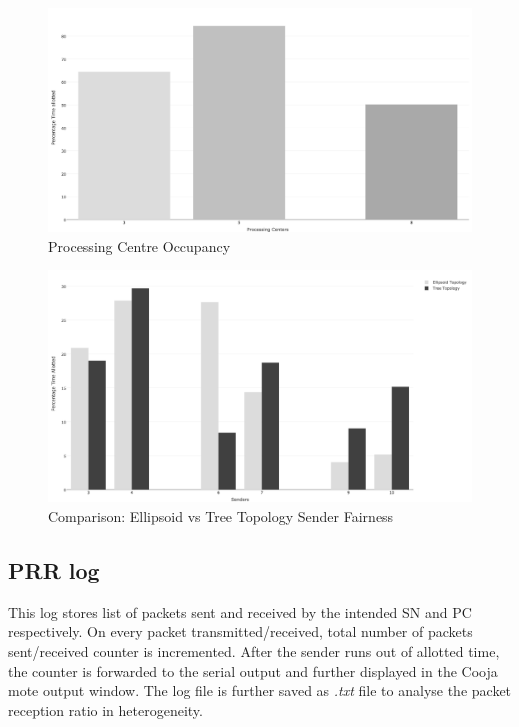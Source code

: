 \begin{enumerate}
    	\begin{figure}
        \centering
        \includegraphics[width=1.0\textwidth]{gfx/RPlots/PCOccupancy.png}
        \caption{Processing Centre Occupancy}
        \label{fig:pcenterOccupancy}
        \end{figure}
        
    \end{enumerate}

	\begin{figure}
    \centering
    \includegraphics[width=1.0\textwidth]{gfx/RPlots/treevsellipsoid_fairness.png}
    \caption{Comparison: Ellipsoid vs Tree  Topology Sender Fairness}
    \label{fig:TreeVsEllipsoidTopology}
    \end{figure}
    
    \subsection*{\ac{PRR} log}\label{subsec:prrlog}
    
    This log stores list of packets sent and received by the intended \ac{SN} and \ac{PC} respectively. On every packet transmitted/received, total number of packets sent/received counter is incremented. After the sender runs out of allotted time, the counter is forwarded to the serial output and further displayed in the Cooja mote output window. The log file is further saved as \textit{.txt} file to analyse the packet reception ratio in heterogeneity.
    
